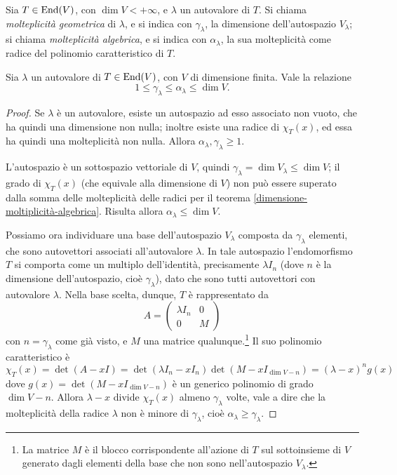 \begin{definizione} \label{d:molteplicita-autovalori}
	Sia $T\in\operatorname{End}(V)$, con $\dim V<+\infty$, e $\lambda$ un autovalore di $T$.
	Si chiama \emph{molteplicità geometrica} di $\lambda$, e si indica con $\gamma_\lambda$, la dimensione dell'autospazio $V_\lambda$; si chiama \emph{molteplicità algebrica}, e si indica con $\alpha_\lambda$, la sua molteplicità come radice del polinomio caratteristico di $T$.
\end{definizione}
\begin{teorema}
	Sia $\lambda$ un autovalore di $T\in\operatorname{End}(V)$, con $V$ di dimensione finita.
	Vale la relazione
	\begin{equation*}
		1\leq\gamma_\lambda\leq\alpha_\lambda\leq\dim V.
	\end{equation*}
\end{teorema}
\begin{proof}
	Se $\lambda$ è un autovalore, esiste un autospazio ad esso associato non vuoto, che ha quindi una dimensione non nulla; inoltre esiste una radice di $\chi_T(x)$, ed essa ha quindi una molteplicità non nulla.
	Allora $\alpha_\lambda,\gamma_\lambda\geq 1$.

	L'autospazio è un sottospazio vettoriale di $V$, quindi $\gamma_\lambda=\dim V_\lambda\leq\dim V$; il grado di $\chi_T(x)$ (che equivale alla dimensione di $V$) non può essere superato dalla somma delle molteplicità delle radici per il teorema \ref{dimensione-moltiplicità-algebrica}.
	Risulta allora $\alpha_\lambda\le\dim V$.

	Possiamo ora individuare una base dell'autospazio $V_\lambda$ composta da $\gamma_\lambda$ elementi, che sono autovettori associati all'autovalore $\lambda$.
	In tale autospazio l'endomorfismo $T$ si comporta come un multiplo dell'identità, precisamente $\lambda I_n$ (dove $n$ è la dimensione dell'autospazio, cioè $\gamma_\lambda$), dato che sono tutti autovettori con autovalore $\lambda$.
	Nella base scelta, dunque, $T$ è rappresentato da
	\begin{equation*}
		A=
		\begin{pmatrix}
			\lambda I_n & 0\\
			0			& M
		\end{pmatrix}
	\end{equation*}
con $n=\gamma_\lambda$ come già visto, e $M$ una matrice qualunque.\footnote{La matrice $M$ è il blocco corrispondente all'azione di $T$ sul sottoinsieme di $V$ generato dagli elementi della base che non sono nell'autospazio $V_\lambda$.}
	Il suo polinomio caratteristico è $\chi_T(x)=\det(A-xI)=\det(\lambda I_n-xI_n)\det(M-xI_{\dim V-n})=(\lambda-x)^ng(x)$ dove $g(x)=\det(M-xI_{\dim V-n})$ è un generico polinomio di grado $\dim V-n$.
	Allora $\lambda-x$ divide $\chi_T(x)$ almeno $\gamma_\lambda$ volte, vale a dire che la molteplicità della radice $\lambda$ non è minore di $\gamma_\lambda$, cioè $\alpha_\lambda\ge\gamma_\lambda$.
\end{proof}

